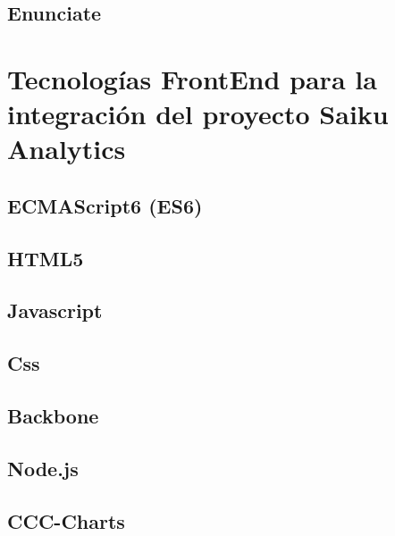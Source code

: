\begin{spacing}{1.5}
	\subsection{Enunciate}
			\lipsum[1-2]
\section{Tecnolog\'{i}as FrontEnd para la integraci\'{o}n
		 del proyecto Saiku Analytics}
		\lipsum[1-2]
	\subsection{ECMAScript6 (ES6)}
			\lipsum[1-2]
	\subsection{HTML5}
			\lipsum[1-2]
	\subsection{Javascript}
			\lipsum[1-2]
	\subsection{Css}
			\lipsum[1-2]
	\subsection{Backbone}
			\lipsum[1-2]
	\subsection{Node.js}
			\lipsum[1-2]
	\subsection{CCC-Charts}
			\lipsum[1-2]
\end{spacing}
		
		
		
